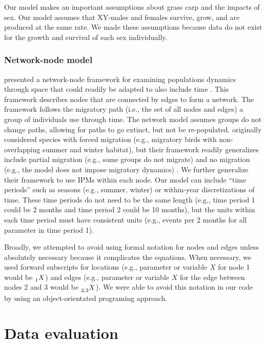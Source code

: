 \documentclass{article}[12pt]
\begin{document}
Our model makes an important assumptions about grass carp and the impacts of sex.
Our model assumes that XY-males and females survive, grow, and are produced at the same rate.
We made these assumptions because data do not exist for the growth and survival of each sex individually.

\subsubsection{Network-node model}


 \citet{Taylor:2010} presented a network-node framework for examining populations dynamics through space that could readily be adapted to also include time \citep[e.g.,][]{Erickson:2014, Wiederholt:inreview, erickson2016effects}.
This framework describes nodes that are connected by edges to form a network. 
The framework follows the migratory path (i.e., the set of all nodes and edges) a group of individuals use through time.
The network model assumes groups do not change paths, allowing for paths to go extinct, but not be re-populated.
 \citet{Taylor:2010} originally considered species with forced migration (e.g., migratory birds with non-overlapping summer and winter habitat), but their framework readily generalizes include partial migration (e.g., some groups do not migrate) and no migration (e.g., the model does not impose migratory dynamics) \citep{erickson:2017}. 
 We further generalize their framework to use IPMs within each node. 
 Our model can include ``time periods'' such as seasons (e.g., summer, winter) or within-year discretizations of time. 
 These time periods do not need to be the same length (e.g., time period 1 could be 2 months and time period 2 could be 10 months), but the units within each time period must have consistent units (e.g., events per 2 months for all parameter in time period 1).
 
Broadly, we attempted to avoid using formal notation for nodes and edges unless absolutely necessary because it complicates the equations.
When necessary, we used forward subscripts for locations (e.g., parameter or variable \(X\) for node 1 would be \(\prescript{}{1}{X}\)) and edges (e.g.,  parameter or variable \(X\) for the edge between nodes 2 and 3 would be \(\prescript{}{2,3}{X}\)).
We were able to avoid this notation in our code by using an object-orientated programing approach.

\stopcontents[sections]

\section{Data evaluation}\label{sec:dev}
\end{document}
